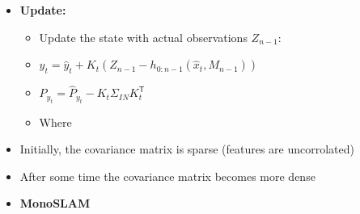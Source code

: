 \documentclass[a4paper]{article}
\newcommand{\ides}[1]{\item \textbf{#1}}
\newcommand{\transpose}{\mathsf{T}}
\begin{document}
\begin{itemize}
\begin{itemize}
            \item Measurement model $\hat z_i=h_i(\hat x_t, m_i)$ as in EKF localization
        \end{itemize}
    \item[S3)] \textbf{Update:}
        \begin{itemize}
            \item Update the state with actual observations $Z_{n-1}$:
            \item $y_t = \hat y_t + K_t (Z_{n-1} - h_{0:n-1}(\hat x_t, M_{n-1}))$
            \item $P_{y_t} = \hat P_{y_t} - K_t \Sigma_{IN} K_t^\transpose$
            \item Where
        \end{itemize}
    \item Initially, the covariance matrix is sparse (features are uncorrolated)
    \item After some time the covariance matrix becomes more dense
    \ides{MonoSLAM}
\end{itemize}
\end{document}
